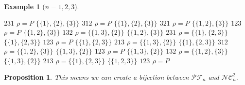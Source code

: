 \documentclass[12pt]{report}
\newtheorem*{prop}{Proposition}
\newtheorem*{example}{Example}
\begin{document}
\begin{example}[$n = 1, 2, 3$]
\begin{itemize}
                $231$ \hspace{1cm} $\rho = P$
            \subitem $\{\{1\}, \{2\}, \{3\}\}$ \hspace{1cm}
                $312$ \hspace{1cm} $\rho = P$
            \subitem $\{\{1\}, \{2\}, \{3\}\}$ \hspace{1cm}
                $321$ \hspace{1cm} $\rho = P$       
            \subitem $\{\{1, 2\}, \{3\}\}$ \hspace{14mm}
                $123$ \hspace{1cm} $\rho = P$
            \subitem $\{\{1, 2\}, \{3\}\}$ \hspace{14mm}
                $132$ \hspace{1cm} $\rho = \{\{1, 3\}, \{2\}\}$
            \subitem $\{\{1, 2\}, \{3\}\}$ \hspace{14mm}
                $231$ \hspace{1cm} $\rho = \{\{1\}, \{2, 3\}\}$
            \subitem $\{\{1\}, \{2, 3\}\}$ \hspace{14mm}
                $123$ \hspace{1cm} $\rho = P$
            \subitem $\{\{1\}, \{2, 3\}\}$ \hspace{14mm}
                $213$ \hspace{1cm} $\rho = \{\{1, 3\}, \{2\}\}$
            \subitem $\{\{1\}, \{2, 3\}\}$ \hspace{14mm}
                $312$ \hspace{1cm} $\rho = \{\{1, 2\}, \{3\}\}$
            \subitem $\{\{1, 3\}, \{2\}\}$ \hspace{14mm}
                $123$ \hspace{1cm} $\rho = P$
            \subitem $\{\{1, 3\}, \{2\}\}$ \hspace{14mm}
                $132$ \hspace{1cm} $\rho = \{\{1, 2\}, \{3\}\}$
            \subitem $\{\{1, 3\}, \{2\}\}$ \hspace{14mm}
                $213$ \hspace{1cm} $\rho = \{\{1\}, \{2, 3\}\}$  
            \subitem $\{\{1, 2, 3\}\}$ \hspace{18mm}
                $123$ \hspace{1cm} $\rho = P$\\
    \end{itemize}
\end{example}

\begin{prop}
    This means we can create a \emph{bijection} between
    $\mathcal{PF}_n$ and $\mathcal{NC}^2_n$.
\end{prop}
\end{document}
